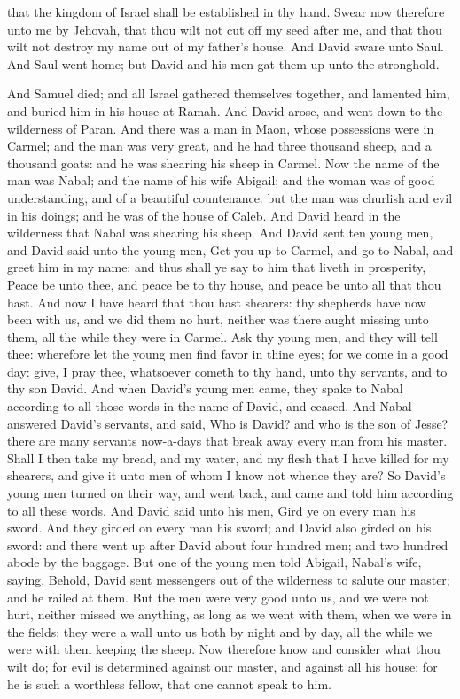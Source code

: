 that the kingdom of Israel shall be established in thy hand. Swear now therefore unto me by Jehovah, that thou wilt not cut off my seed after me, and that thou wilt not destroy my name out of my father’s house. And David sware unto Saul. And Saul went home; but David and his men gat them up unto the stronghold. 

And Samuel died; and all Israel gathered themselves together, and lamented him, and buried him in his house at Ramah. And David arose, and went down to the wilderness of Paran.  And there was a man in Maon, whose possessions were in Carmel; and the man was very great, and he had three thousand sheep, and a thousand goats: and he was shearing his sheep in Carmel. Now the name of the man was Nabal; and the name of his wife Abigail; and the woman was of good understanding, and of a beautiful countenance: but the man was churlish and evil in his doings; and he was of the house of Caleb. And David heard in the wilderness that Nabal was shearing his sheep. And David sent ten young men, and David said unto the young men, Get you up to Carmel, and go to Nabal, and greet him in my name: and thus shall ye say to him that liveth in prosperity, Peace be unto thee, and peace be to thy house, and peace be unto all that thou hast. And now I have heard that thou hast shearers: thy shepherds have now been with us, and we did them no hurt, neither was there aught missing unto them, all the while they were in Carmel. Ask thy young men, and they will tell thee: wherefore let the young men find favor in thine eyes; for we come in a good day: give, I pray thee, whatsoever cometh to thy hand, unto thy servants, and to thy son David.  And when David’s young men came, they spake to Nabal according to all those words in the name of David, and ceased. And Nabal answered David’s servants, and said, Who is David? and who is the son of Jesse? there are many servants now-a-days that break away every man from his master. Shall I then take my bread, and my water, and my flesh that I have killed for my shearers, and give it unto men of whom I know not whence they are? So David’s young men turned on their way, and went back, and came and told him according to all these words. And David said unto his men, Gird ye on every man his sword. And they girded on every man his sword; and David also girded on his sword: and there went up after David about four hundred men; and two hundred abode by the baggage.  But one of the young men told Abigail, Nabal’s wife, saying, Behold, David sent messengers out of the wilderness to salute our master; and he railed at them. But the men were very good unto us, and we were not hurt, neither missed we anything, as long as we went with them, when we were in the fields: they were a wall unto us both by night and by day, all the while we were with them keeping the sheep. Now therefore know and consider what thou wilt do; for evil is determined against our master, and against all his house: for he is such a worthless fellow, that one cannot speak to him.  